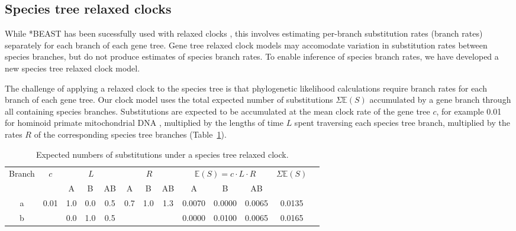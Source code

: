 \documentclass[12pt]{article}
\begin{document}
\subsection*{Species tree relaxed clocks}

While *BEAST has been sucessfully used with relaxed clocks
\citep{Berv2014120,Lambert2015146}, this involves estimating per-branch
substitution rates (branch rates) separately for each branch of each gene tree.
Gene tree relaxed clock models may accomodate variation in substitution rates
between species branches, but do not produce estimates of species branch rates. To enable
inference of species branch rates, we have developed a new species tree relaxed
clock model.

The challenge of applying a relaxed clock to the species tree is that
phylogenetic likelihood calculations require branch rates for each branch of
each gene tree. Our clock model uses the total expected number of substitutions
$\Sigma \mathbb{E}(S)$ accumulated by a gene branch through all containing
species branches. Substitutions are expected to be accumulated at the mean
clock rate of the gene tree $c$, for example 0.01 for hominoid primate
mitochondrial DNA \citep{doi:10.1146/annurev.es.18.110187.001413}, multiplied
by the lengths of time $L$ spent traversing each species tree branch, multiplied
by the rates $R$ of the corresponding species tree branches
(Table~\ref{tab:branchRateModel}).

\begin{table}[htb!]
\centering
\caption{Expected numbers of substitutions under a species tree relaxed clock.}
\label{tab:branchRateModel}
\begin{threeparttable}
\begin{adjustbox}{center}
\begin{tabular}{|c|c|c|c|c|c|c|c|c|c|c|c|c|}
\hline
\multirow{2}{*}{Branch} & \multirow{2}{*}{$c$} & \multicolumn{3}{c|}{$L$} & \multicolumn{3}{c|}{$R$} & \multicolumn{3}{c|}{$\mathbb{E}(S) = c\cdot L\cdot R$} & \multirow{2}{*}{$\Sigma \mathbb{E}(S)$}\tabularnewline
\cline{3-11}
 & & A & B & AB & A & B & AB & A & B & AB & \tabularnewline
\hline
a & \multirow{2}{*}{0.01} & 1.0 & 0.0 & 0.5 & \multirow{2}{*}{0.7} & \multirow{2}{*}{1.0} & \multirow{2}{*}{1.3} & 0.0070 & 0.0000 & 0.0065 & 0.0135\tabularnewline
\cline{1-1} \cline{3-5} \cline{9-12}
b & & 0.0 & 1.0 & 0.5 & & & & 0.0000 & 0.0100 & 0.0065 & 0.0165\tabularnewline
\hline
\end{tabular}
\end{adjustbox}
\end{threeparttable}
\end{table}
\end{document}
